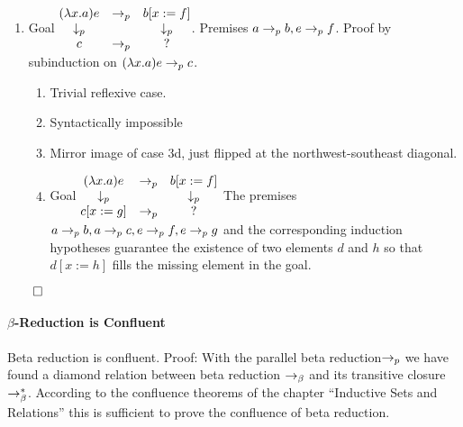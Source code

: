\begin{theorem}
\begin{enumerate}
  \item
    Goal $\begin{matrix} (\lambda x.a) e & \to_p & b[x:=f] \\ \downarrow_p & & \downarrow_p \\ c & \to_p & ? \end{matrix}$. Premises $a \to_{p} b, e \to_{p} f$.
    Proof by subinduction on $(\lambda x.a) e \to_{p} c$.
    \begin{enumerate}
    \item Trivial reflexive case.
    \item Syntactically impossible
    \item Mirror image of case 3d, just flipped at the northwest-southeast diagonal.
    \item
      Goal $\begin{matrix} (\lambda x.a) e & \to_p & b[x:=f] \\ \downarrow_p & & \downarrow_p \\ c[x:=g] & \to_p & ? \end{matrix}$
      The premises $a \to_{p} b, a \to_{p} c, e \to_{p} f, e \to_{p} g$
      and the corresponding induction hypotheses guarantee the existence of
      two elements $d$ and $h$ so that $d[x:=h]$ fills the missing element
      in the goal.
    \end{enumerate}

  \end{enumerate}
  $\qed$
\end{theorem}

\paragraph{$\beta$-Reduction is Confluent}

\begin{theorem}
  Beta reduction is confluent.
  Proof: With the parallel beta reduction$\to_{p}$ we have found a diamond
  relation between beta reduction $\to_\beta$ and its transitive closure
  $\to^*_\beta$. According to the confluence theorems of the chapter
  ``Inductive Sets and Relations'' this is sufficient to prove the confluence
  of beta reduction.
\end{theorem}
